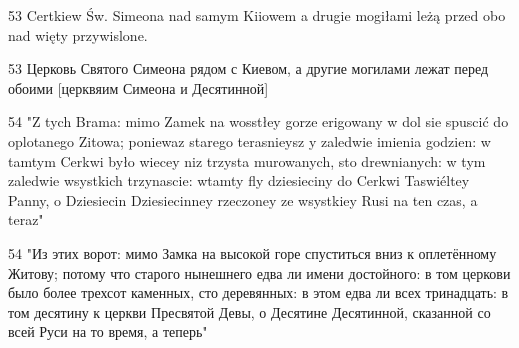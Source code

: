 53 Certkiew Św. Simeona nad samym Kiiowem a drugie mogiłami leżą przed obo nad więty przywislone.

53 Церковь Святого Симеона рядом с Киевом, а другие могилами лежат перед обоими [церквяим Симеона и Десятинной] 


54 "Z tych Brama: mimo Zamek na wosstłey gorze erigowany w dol sie spuscić do oplotanego Zitowa; poniewaz starego terasnieysz y zaledwie imienia godzien: w tamtym Cerkwi było wiecey niz trzysta murowanych, sto drewnianych: w tym zaledwie wsystkich trzynascie: wtamty fly dziesieciny do Cerkwi Taswiéltey Panny, o Dziesiecin Dziesiecinney rzeczoney ze wsystkiey Rusi na ten czas, a teraz"


54 "Из этих ворот: мимо Замка на высокой горе спуститься вниз к оплетённому Житову; потому что старого нынешнего едва ли имени достойного: в том церкови было более трехсот каменных, сто деревянных: в этом едва ли всех тринадцать: в том десятину к церкви Пресвятой Девы, о Десятине Десятинной, сказанной со всей Руси на то время, а теперь"

